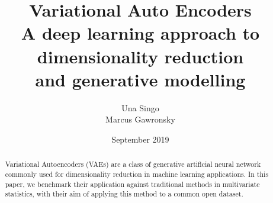 \documentclass[12pt]{extarticle}
\title{Variational Auto Encoders \\  \large A deep learning approach to dimensionality reduction \\and generative modelling}
\author{Una Singo \\ Marcus Gawronsky }
\date{September 2019}
\begin{document}
\maketitle


\begin{abstract}
Variational Autoencoders (VAEs) are a class of generative artificial neural network commonly used for dimensionality reduction in machine learning applications.  In this paper, we benchmark their application against traditional methods in multivariate statistics, with their aim of applying this method to a common open dataset.  
\end{abstract}





\end{document}
